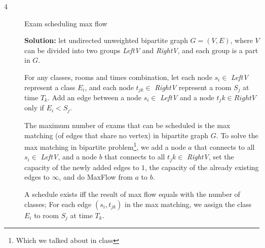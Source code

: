 \documentclass{article}
\begin{document}
\begin{description}

\item[4]{Exam scheduling max flow}

  \textbf{Solution:} let undirected unweighted bipartite graph $G = (V, E)$, where $V$ can be divided into two groups \textit{LeftV} and \textit{RightV}, and each group is a part in $G$. 

  For any classes, rooms and times combination, let each node $s_i \in$ \textit{LeftV} represent a class $E_i$, and each node $t_{jk} \in$ \textit{RightV} represent a room $S_j$ at time $T_k$. Add an edge between a node $s_i \in$ \textit{LeftV} and a node $t_jk \in RightV$ only if $E_i < S_j$.

  The maximum number of exams that can be scheduled is the max matching (of edges that share no vertex) in bipartite graph $G$. To solve the max matching in bipartite problem\footnote{Which we talked about in class}, we add a node $a$ that connects to all $s_i \in$ \textit{LeftV}, and a node $b$ that connects to all $t_jk \in$ \textit{RightV}, set the capacity of the newly added edges to $1$, the capacity of the already existing edges to $\infty$, and do MaxFlow from $a$ to $b$.

  A schedule exists iff the result of max flow equals with the number of classes; For each edge $(s_i, t_{jk})$ in the max matching, we assign the class $E_i$ to room $S_j$ at time $T_k$.

\end{description}
\end{document}
